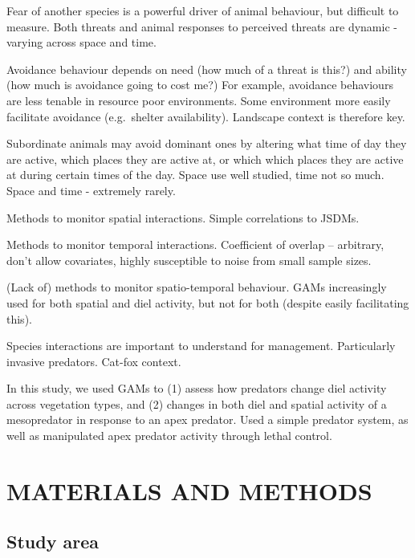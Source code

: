 \documentclass[]{elsarticle} %
\begin{document}
Fear of another species is a powerful driver of animal behaviour, but difficult to measure.
Both threats and animal responses to perceived threats are dynamic - varying across space and time.

Avoidance behaviour depends on need (how much of a threat is this?) and ability (how much is avoidance going to cost me?)
For example, avoidance behaviours are less tenable in resource poor environments. Some environment more easily facilitate avoidance (e.g.~shelter availability).
Landscape context is therefore key.

Subordinate animals may avoid dominant ones by altering what time of day they are active, which places they are active at, or which which places they are active at during certain times of the day.
Space use well studied, time not so much. Space and time - extremely rarely.

Methods to monitor spatial interactions.
Simple correlations to JSDMs.

Methods to monitor temporal interactions.
Coefficient of overlap -- arbitrary, don't allow covariates, highly susceptible to noise from small sample sizes.

(Lack of) methods to monitor spatio-temporal behaviour.
GAMs increasingly used for both spatial and diel activity, but not for both (despite easily facilitating this).

Species interactions are important to understand for management.
Particularly invasive predators.
Cat-fox context.

In this study, we used GAMs to (1) assess how predators change diel activity across vegetation types, and (2) changes in both diel and spatial activity of a mesopredator in response to an apex predator. Used a simple predator system, as well as manipulated apex predator activity through lethal control.

\newpage

\hypertarget{materials-and-methods}{%
\section{MATERIALS AND METHODS}\label{materials-and-methods}}

\hypertarget{study-area}{%
\subsection{Study area}\label{study-area}}
\end{document}
